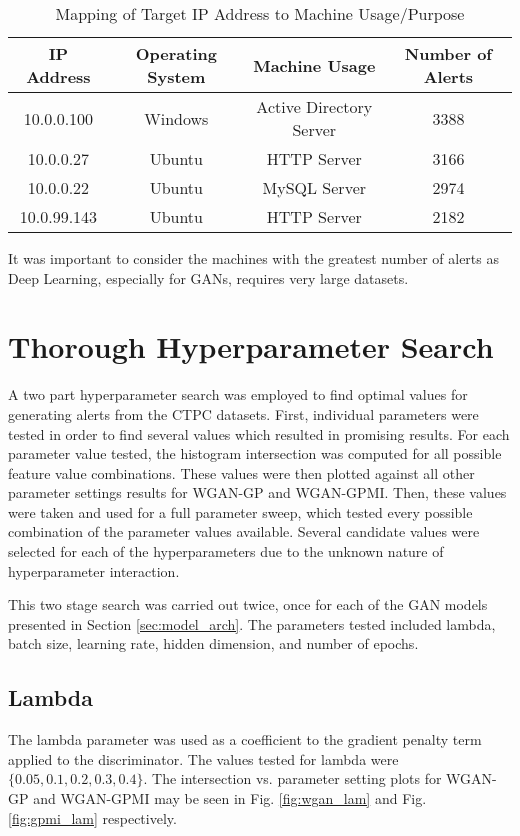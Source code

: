 \begin{table}[!htbp]
	\caption{Mapping of Target IP Address to Machine Usage/Purpose}
	\label{table:mapping}
	\centering
	\begin{tabular}{c|c|c|c}
		\textbf{IP Address} & \textbf{Operating System} & \textbf{Machine Usage} & \textbf{Number of Alerts}\\
		\hline
		10.0.0.100 & Windows & Active Directory Server & 3388\\
		\hline
		10.0.0.27 & Ubuntu & HTTP Server & 3166\\
		\hline
		10.0.0.22 & Ubuntu & MySQL Server & 2974\\
		\hline
		10.0.99.143 & Ubuntu & HTTP Server & 2182
	\end{tabular}
\end{table}

It was important to consider the machines with the greatest number of alerts as Deep Learning, especially for GANs, requires very large datasets.

\section{Thorough Hyperparameter Search}
\label{sec:search}
A two part hyperparameter search was employed to find optimal values for generating alerts from the CTPC datasets. First, individual parameters were tested in order to find several values which resulted in promising results. For each parameter value tested, the histogram intersection was computed for all possible feature value combinations. These values were then plotted against all other parameter settings results for WGAN-GP and WGAN-GPMI. Then, these values were taken and used for a full parameter sweep, which tested every possible combination of the parameter values available. Several candidate values were selected for each of the hyperparameters due to the unknown nature of hyperparameter interaction.

This two stage search was carried out twice, once for each of the GAN models presented in Section \ref{sec:model_arch}. The parameters tested included lambda, batch size, learning rate, hidden dimension, and number of epochs.

\subsection{Lambda}
\label{sec:lam}
The lambda parameter was used as a coefficient to the gradient penalty term applied to the discriminator. The values tested for lambda were $\{0.05, 0.1, 0.2, 0.3, 0.4\}$. The intersection vs. parameter setting plots for WGAN-GP and WGAN-GPMI may be seen in Fig. \ref{fig:wgan_lam} and Fig. \ref{fig:gpmi_lam} respectively.

